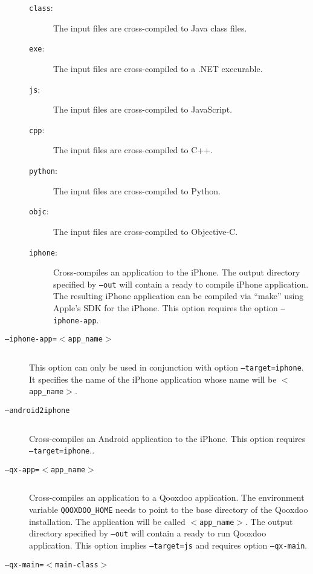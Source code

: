\documentclass[12pt]{article}
\begin{document}
\begin{description}
\begin{description}
\item[\texttt{class}:] The input files are cross-compiled to Java
  class files.

\item[\texttt{exe}:] The input files are cross-compiled to a .NET
  execurable.

\item[\texttt{js}:] The input files are cross-compiled to JavaScript.

\item[\texttt{cpp}:] The input files are cross-compiled to C++.

\item[\texttt{python}:] The input files are cross-compiled to Python.

\item[\texttt{objc}:] The input files are cross-compiled to
  Objective-C.

\item[\texttt{iphone}:] Cross-compiles an application to the iPhone.
  The output directory specified by \texttt{--out} will contain a
  ready to compile iPhone application.  The resulting iPhone
  application can be compiled via ``make'' using Apple's SDK for the
  iPhone. This option requires the option \texttt{--iphone-app}.
\end{description}

\item[\texttt{--iphone-app=$<$app\_name$>$}] $ $

  This option can only be used in conjunction with option
  \texttt{--target=iphone}. It specifies the name of the iPhone
  application whose name will be \texttt{$<$app\_name$>$}.

\item[\texttt{--android2iphone}] $ $

  Cross-compiles an Android application to the iPhone. This option
  requires \texttt{--target=iphone}..

\item[\texttt{--qx-app=$<$app\_name$>$}] $ $

  Cross-compiles an application to a Qooxdoo application. The
  environment variable \texttt{QOOXDOO\_HOME} needs to point to the
  base directory of the Qooxdoo installation. The application will be
  called \texttt{$<$app\_name$>$}. The output directory specified by
  \texttt{--out} will contain a ready to run Qooxdoo application. This
  option implies \texttt{--target=js} and requires option
  \texttt{--qx-main}.

\item[\texttt{--qx-main=$<$main-class$>$}] $ $


\end{description}
\end{document}

